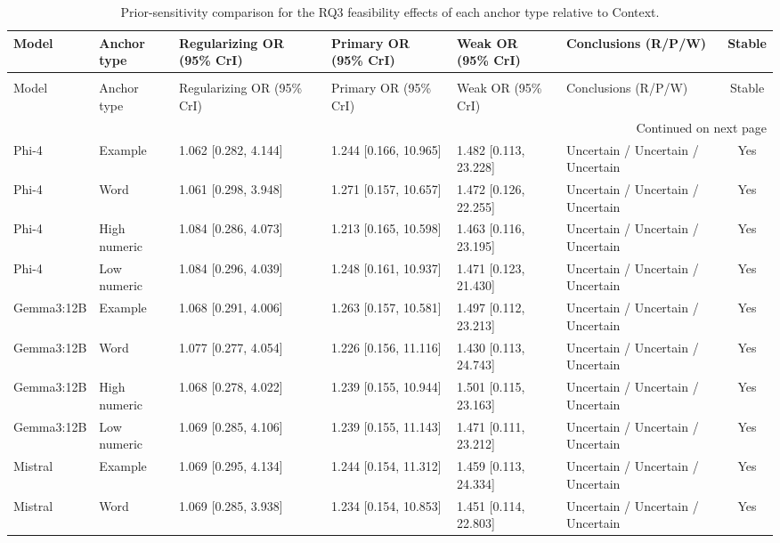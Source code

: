 \begin{longtable}[tbp]{p{2.0cm}p{2.2cm}p{3.1cm}p{3.1cm}p{3.1cm}p{3.7cm}c}
\caption{Prior-sensitivity comparison for the RQ3 feasibility effects of each anchor type relative to Context.} \label{tab:rq3_feasibility_prior_sensitivity} \\
\toprule
Model & Anchor type & Regularizing OR (95\% CrI) & Primary OR (95\% CrI) & Weak OR (95\% CrI) & Conclusions (R/P/W) & Stable \\
\midrule
\endfirsthead
\caption[]{Prior-sensitivity comparison for the RQ3 feasibility effects of each anchor type relative to Context.} \\
\toprule
Model & Anchor type & Regularizing OR (95\% CrI) & Primary OR (95\% CrI) & Weak OR (95\% CrI) & Conclusions (R/P/W) & Stable \\
\midrule
\endhead
\midrule
\multicolumn{7}{r}{Continued on next page} \\
\midrule
\endfoot
\bottomrule
\endlastfoot
Phi-4 & Example & 1.062 [0.282, 4.144] & 1.244 [0.166, 10.965] & 1.482 [0.113, 23.228] & Uncertain / Uncertain / Uncertain & Yes \\
Phi-4 & Word & 1.061 [0.298, 3.948] & 1.271 [0.157, 10.657] & 1.472 [0.126, 22.255] & Uncertain / Uncertain / Uncertain & Yes \\
Phi-4 & High numeric & 1.084 [0.286, 4.073] & 1.213 [0.165, 10.598] & 1.463 [0.116, 23.195] & Uncertain / Uncertain / Uncertain & Yes \\
Phi-4 & Low numeric & 1.084 [0.296, 4.039] & 1.248 [0.161, 10.937] & 1.471 [0.123, 21.430] & Uncertain / Uncertain / Uncertain & Yes \\
Gemma3:12B & Example & 1.068 [0.291, 4.006] & 1.263 [0.157, 10.581] & 1.497 [0.112, 23.213] & Uncertain / Uncertain / Uncertain & Yes \\
Gemma3:12B & Word & 1.077 [0.277, 4.054] & 1.226 [0.156, 11.116] & 1.430 [0.113, 24.743] & Uncertain / Uncertain / Uncertain & Yes \\
Gemma3:12B & High numeric & 1.068 [0.278, 4.022] & 1.239 [0.155, 10.944] & 1.501 [0.115, 23.163] & Uncertain / Uncertain / Uncertain & Yes \\
Gemma3:12B & Low numeric & 1.069 [0.285, 4.106] & 1.239 [0.155, 11.143] & 1.471 [0.111, 23.212] & Uncertain / Uncertain / Uncertain & Yes \\
Mistral & Example & 1.069 [0.295, 4.134] & 1.244 [0.154, 11.312] & 1.459 [0.113, 24.334] & Uncertain / Uncertain / Uncertain & Yes \\
Mistral & Word & 1.069 [0.285, 3.938] & 1.234 [0.154, 10.853] & 1.451 [0.114, 22.803] & Uncertain / Uncertain / Uncertain & Yes \\

\end{longtable}
